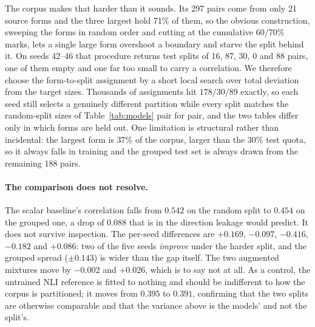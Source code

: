 \documentclass[11pt]{article}
\begin{document}
The corpus makes that harder than it sounds. Its 297 pairs come from only 21
source forms and the three largest hold 71\% of them, so the obvious
construction, sweeping the forms in random order and cutting at the cumulative
60/70\% marks, lets a single large form overshoot a boundary and starve the
split behind it. On seeds 42--46 that procedure returns test splits of 16, 87,
30, 0 and 88 pairs, one of them empty and one far too small to carry a
correlation. We therefore choose the form-to-split assignment by a short local
search over total deviation from the target sizes. Thousands of assignments hit
$178/30/89$ exactly, so each seed still selects a genuinely different partition
while every split matches the random-split sizes of Table~\ref{tab:models} pair
for pair, and the two tables differ only in which forms are held out. One
limitation is structural rather than incidental: the largest form is 37\% of the
corpus, larger than the 30\% test quota, so it always falls in training and the
grouped test set is always drawn from the remaining 188 pairs.

\begin{table}[t]\centering\small

\caption{Document-grouped split: no source form appears in both training and
test. Columns are as in Table~\ref{tab:models}, and the splits are size-matched
to it ($178/30/89$). The untrained NLI reference is recomputed on the grouped
splits rather than carried over, since a corpus-level correlation is not
comparable to a document-grouped one; the human ceiling is a property of the
annotations and does not depend on the split. Comparing against
Table~\ref{tab:models} isolates the part of the reported correlation that
survives a change of source document.}
\label{tab:models_grouped}
\end{table}

\paragraph{The comparison does not resolve.} The scalar baseline's correlation
falls from $0.542$ on the random split to $0.454$ on the grouped one, a drop of
$0.088$ that is in the direction leakage would predict. It does not survive
inspection. The per-seed differences are $+0.169$, $-0.097$, $-0.416$, $-0.182$
and $+0.086$: two of the five seeds \emph{improve} under the harder split, and
the grouped spread ($\pm0.143$) is wider than the gap itself. The two augmented
mixtures move by $-0.002$ and $+0.026$, which is to say not at all. As a
control, the untrained NLI reference is fitted to nothing and should be
indifferent to how the corpus is partitioned; it moves from $0.395$ to $0.391$,
confirming that the two splits are otherwise comparable and that the variance
above is the models' and not the split's.
\end{document}

